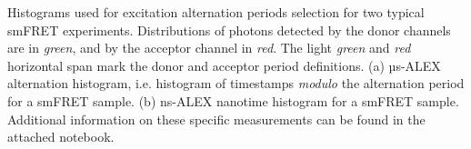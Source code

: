 \label{fig:altern_hist_double}
Histograms used for excitation alternation periods selection for two typical smFRET experiments. 
Distributions of photons detected by the donor channels are in \textit{green}, and by the acceptor channel in \textit{red}.
The light \textit{green} and \textit{red} horizontal span mark the donor and acceptor period definitions.
(a) µs-ALEX alternation histogram, i.e. histogram of timestamps \textit{modulo} the alternation period for a smFRET sample. 
(b) ns-ALEX nanotime histogram for a smFRET sample. Additional information on these specific measurements can be found in the 
attached notebook.